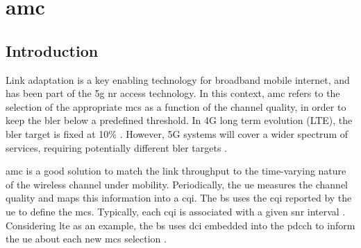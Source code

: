 \chapter{\Acl{amc}}
\label{chp:amc}
\section{Introduction}
\label{sec:amc-intro}


Link adaptation is a key enabling technology for broadband mobile internet, and has been part of the \gls{5g} \gls{nr} access technology.
%
In this context, \gls{amc} refers to the selection of the appropriate \gls{mcs} as a function of the channel quality, in order to keep the \gls{bler} below a predefined threshold.
%
In 4G long term evolution (LTE), the \gls{bler} target is fixed at 10\% \cite{3gpp.36.213}. However, 5G systems will cover a wider spectrum of services, requiring potentially different \gls{bler} targets \cite{Amin_2016,fantacci2009adaptive}.

%
%

\Gls{amc} is a good solution to match the link throughput to the time-varying nature of the wireless channel under mobility.
%
Periodically, the \gls{ue} measures the channel quality and maps this information into a \gls{cqi}.
%
The \gls{bs} uses the \gls{cqi} reported by the \gls{ue} to define the \gls{mcs}.
%
Typically, each \gls{cqi} is associated with a given \gls{snr} interval \cite{Blanquez-Casado2016}.
%
Considering \gls{lte} as an example, the \gls{bs} uses \gls{dci} embedded into the \gls{pdcch} to inform the \gls{ue} about each new \gls{mcs} selection \cite{ErikDahlman5G}.

%

